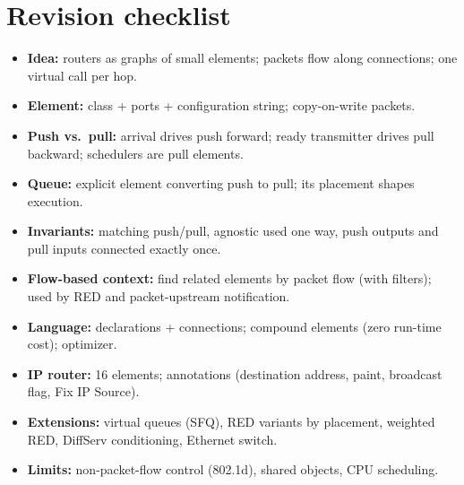 \section{Revision checklist}
\begin{itemize}
\item \textbf{Idea:} routers as graphs of small elements; packets flow along connections; one virtual call per hop.
\item \textbf{Element:} class + ports + configuration string; copy-on-write packets.
\item \textbf{Push vs.\ pull:} arrival drives push forward; ready transmitter drives pull backward; schedulers are pull elements.
\item \textbf{Queue:} explicit element converting push to pull; its placement shapes execution.
\item \textbf{Invariants:} matching push/pull, agnostic used one way, push outputs and pull inputs connected exactly once.
\item \textbf{Flow-based context:} find related elements by packet flow (with filters); used by RED and packet-upstream notification.
\item \textbf{Language:} declarations + connections; compound elements (zero run-time cost); optimizer.
\item \textbf{IP router:} 16 elements; annotations (destination address, paint, broadcast flag, Fix IP Source).
\item \textbf{Extensions:} virtual queues (SFQ), RED variants by placement, weighted RED, DiffServ conditioning, Ethernet switch.
\item \textbf{Limits:} non-packet-flow control (802.1d), shared objects, CPU scheduling.
\end{itemize}
